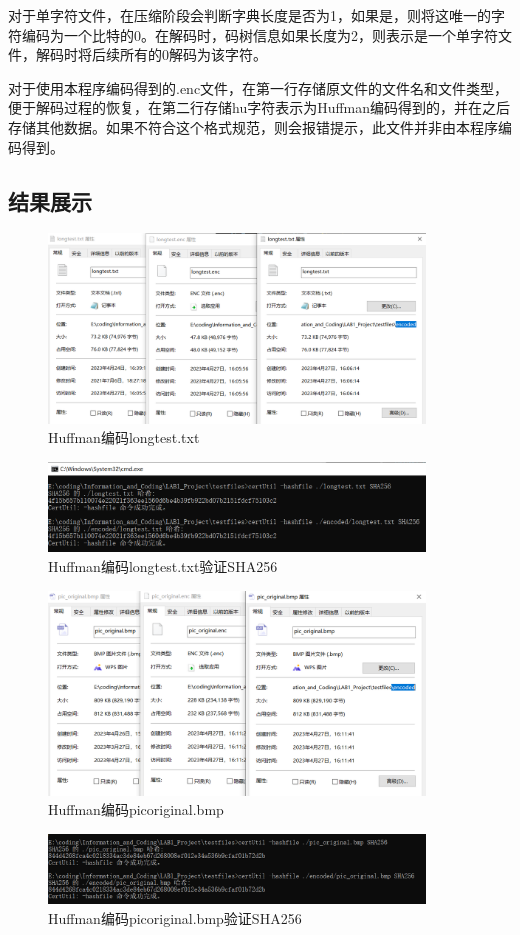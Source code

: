 \documentclass[12pt, a4paper]{ctexart}
\begin{document}
    对于单字符文件，在压缩阶段会判断字典长度是否为1，如果是，则将这唯一的字符编码为一个比特的0。在解码时，码树信息如果长度为2，则表示是一个单字符文件，解码时将后续所有的0解码为该字符。

    对于使用本程序编码得到的.enc文件，在第一行存储原文件的文件名和文件类型，便于解码过程的恢复，在第二行存储hu字符表示为Huffman编码得到的，并在之后存储其他数据。如果不符合这个格式规范，则会报错提示，此文件并非由本程序编码得到。

    \subsection{结果展示}
    \begin{figure}[H]
    \centering
    \includegraphics[width=10cm]{./pic/1-1.png}		
    \caption{Huffman编码longtest.txt}
    \end{figure}
    \begin{figure}[H]
    \centering
    \includegraphics[width=10cm]{./pic/1-2.png}		
    \caption{Huffman编码longtest.txt验证SHA256}
    \end{figure}

    \begin{figure}[H]
    \centering
    \includegraphics[width=10cm]{./pic/2-1.png}		
    \caption{Huffman编码picoriginal.bmp}
    \end{figure}
    \begin{figure}[H]
    \centering
    \includegraphics[width=10cm]{./pic/2-2.png}		
    \caption{Huffman编码picoriginal.bmp验证SHA256}
    \end{figure}
\end{document}
